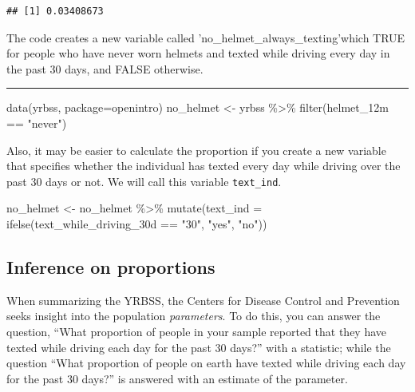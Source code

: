 \documentclass[
]{article}
\newenvironment{Shaded}{\begin{snugshade}}{\end{snugshade}}
\newcommand{\AttributeTok}[1]{\textcolor[rgb]{0.77,0.63,0.00}{#1}}
\newcommand{\FunctionTok}[1]{\textcolor[rgb]{0.00,0.00,0.00}{#1}}
\newcommand{\NormalTok}[1]{#1}
\newcommand{\OtherTok}[1]{\textcolor[rgb]{0.56,0.35,0.01}{#1}}
\newcommand{\SpecialCharTok}[1]{\textcolor[rgb]{0.00,0.00,0.00}{#1}}
\newcommand{\StringTok}[1]{\textcolor[rgb]{0.31,0.60,0.02}{#1}}
\begin{document}
\begin{verbatim}
## [1] 0.03408673
\end{verbatim}

The code creates a new variable called
'no\_helmet\_always\_texting'which TRUE for people who have never worn
helmets and texted while driving every day in the past 30 days, and
FALSE otherwise.

\begin{center}\rule{0.5\linewidth}{0.5pt}\end{center}

\begin{Shaded}
\begin{Highlighting}[]
\FunctionTok{data}\NormalTok{(}\StringTok{\textquotesingle{}yrbss\textquotesingle{}}\NormalTok{, }\AttributeTok{package=}\StringTok{\textquotesingle{}openintro\textquotesingle{}}\NormalTok{)}
\NormalTok{no\_helmet }\OtherTok{\textless{}{-}}\NormalTok{ yrbss }\SpecialCharTok{\%\textgreater{}\%}
  \FunctionTok{filter}\NormalTok{(helmet\_12m }\SpecialCharTok{==} \StringTok{"never"}\NormalTok{)}
\end{Highlighting}
\end{Shaded}

Also, it may be easier to calculate the proportion if you create a new
variable that specifies whether the individual has texted every day
while driving over the past 30 days or not. We will call this variable
\texttt{text\_ind}.

\begin{Shaded}
\begin{Highlighting}[]
\NormalTok{no\_helmet }\OtherTok{\textless{}{-}}\NormalTok{ no\_helmet }\SpecialCharTok{\%\textgreater{}\%}
  \FunctionTok{mutate}\NormalTok{(}\AttributeTok{text\_ind =} \FunctionTok{ifelse}\NormalTok{(text\_while\_driving\_30d }\SpecialCharTok{==} \StringTok{"30"}\NormalTok{, }\StringTok{"yes"}\NormalTok{, }\StringTok{"no"}\NormalTok{))}
\end{Highlighting}
\end{Shaded}

\hypertarget{inference-on-proportions}{%
\subsection{Inference on proportions}\label{inference-on-proportions}}

When summarizing the YRBSS, the Centers for Disease Control and
Prevention seeks insight into the population \emph{parameters}. To do
this, you can answer the question, ``What proportion of people in your
sample reported that they have texted while driving each day for the
past 30 days?'' with a statistic; while the question ``What proportion
of people on earth have texted while driving each day for the past 30
days?'' is answered with an estimate of the parameter.
\end{document}
